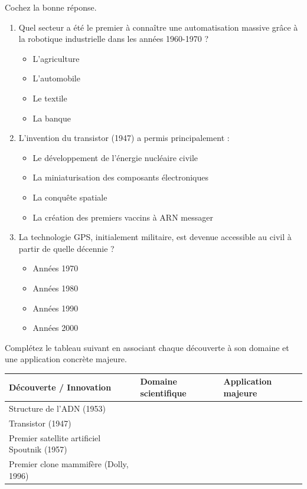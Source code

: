 \documentclass[11pt]{article}
\begin{document}
\begin{exercice}
Cochez la bonne réponse.
\begin{enumerate}
    \item Quel secteur a été le premier à connaître une automatisation massive grâce à la robotique industrielle dans les années 1960-1970 ?
\begin{itemize}
        \item[$\square$] L'agriculture
        \item[$\square$] L'automobile
        \item[$\square$] Le textile
        \item[$\square$] La banque
    \end{itemize}
    \item L'invention du transistor (1947) a permis principalement :
\begin{itemize}
        \item[$\square$] Le développement de l'énergie nucléaire civile
        \item[$\square$] La miniaturisation des composants électroniques
        \item[$\square$] La conquête spatiale
        \item[$\square$] La création des premiers vaccins à ARN messager
    \end{itemize}
    \item La technologie GPS, initialement militaire, est devenue accessible au civil à partir de quelle décennie ?
\begin{itemize}
        \item[$\square$] Années 1970
        \item[$\square$] Années 1980
        \item[$\square$] Années 1990
        \item[$\square$] Années 2000
    \end{itemize}
\end{enumerate}
\end{exercice}

\begin{exercice}
Complétez le tableau suivant en associant chaque découverte à son domaine et une application concrète majeure.

\begin{tabularx}{\linewidth}{|X|X|X|}
\hline
\textbf{Découverte / Innovation} & \textbf{Domaine scientifique} & \textbf{Application majeure} \\
\hline
Structure de l'ADN (1953) & \dotfill & \dotfill \\
\hline
Transistor (1947) & \dotfill & \dotfill \\
\hline
Premier satellite artificiel Spoutnik (1957) & \dotfill & \dotfill \\
\hline
Premier clone mammifère (Dolly, 1996) & \dotfill & \dotfill \\
\hline
\end{tabularx}
\end{exercice}
\end{document}
